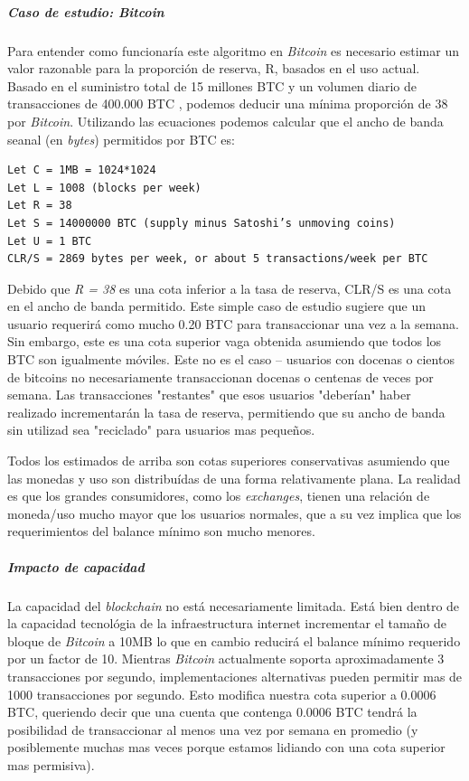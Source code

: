 \documentclass[a4paper,titlepage,final]{article}
\begin{document}
\subparagraph{Caso de estudio: \textit{Bitcoin}}

Para entender como funcionaría este algoritmo en \textit{Bitcoin} es necesario estimar un valor razonable para la proporción de reserva, R, basados en el uso actual. Basado en el suministro total de 15 millones BTC y un volumen diario de transacciones de 400.000 BTC \cite{10}, podemos deducir una mínima proporción de 38 por \textit{Bitcoin}. Utilizando las ecuaciones podemos calcular que el ancho de banda seanal (en \textit{bytes}) permitidos por BTC es:

\begin{lstlisting}[frame=single]
Let C = 1MB = 1024*1024
Let L = 1008 (blocks per week)
Let R = 38
Let S = 14000000 BTC (supply minus Satoshi’s unmoving coins)
Let U = 1 BTC
CLR/S = 2869 bytes per week, or about 5 transactions/week per BTC
\end{lstlisting}

Debido que \textit{R = 38} es una cota inferior a la tasa de reserva, CLR/S es una cota en el ancho de banda permitido. Este simple caso de estudio sugiere que un usuario requerirá como mucho 0.20 BTC para transaccionar una vez a la semana. Sin embargo, este es una cota superior vaga obtenida asumiendo que todos los BTC son igualmente móviles. Este no es el caso -- usuarios con docenas o cientos de bitcoins no necesariamente transaccionan docenas o centenas de veces por semana. Las transacciones "restantes" que esos usuarios "deberían" haber realizado incrementarán la tasa de reserva, permitiendo que su ancho de banda sin utilizad sea "reciclado" para usuarios mas pequeños.

Todos los estimados de arriba son cotas superiores conservativas asumiendo que las monedas y uso son distribuídas de una forma relativamente plana. La realidad es que los grandes consumidores, como los \textit{exchanges}, tienen una relación de moneda/uso mucho mayor que los usuarios normales, que a su vez implica que los requerimientos del balance mínimo son mucho menores.

\subparagraph{Impacto de capacidad}

La capacidad del \textit{blockchain} no está necesariamente limitada. Está bien dentro de la capacidad tecnológia de la infraestructura internet incrementar el tamaño de bloque de \textit{Bitcoin} a 10MB lo que en cambio reducirá el balance mínimo requerido por un factor de 10. Mientras \textit{Bitcoin} actualmente soporta aproximadamente 3 transacciones por segundo, implementaciones alternativas pueden permitir mas de 1000 transacciones por segundo. Esto modifica nuestra cota superior a 0.0006 BTC, queriendo decir que una cuenta que contenga 0.0006 BTC tendrá la posibilidad de transaccionar al menos una vez por semana en promedio (y posiblemente muchas mas veces porque estamos lidiando con una cota superior mas permisiva).
\end{document}
